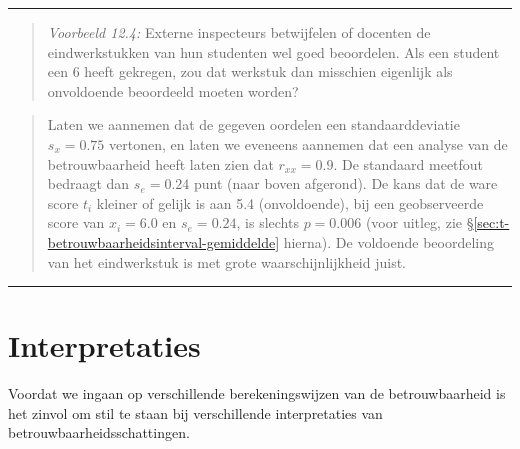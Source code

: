 \documentclass[
]{book}
\begin{document}
\begin{center}\rule{0.5\linewidth}{0.5pt}\end{center}

\begin{quote}
\emph{Voorbeeld 12.4:}
Externe inspecteurs betwijfelen of docenten de eindwerkstukken van hun
studenten wel goed beoordelen. Als een student een 6 heeft gekregen, zou
dat werkstuk dan misschien eigenlijk als onvoldoende beoordeeld moeten
worden?
\end{quote}

\begin{quote}
Laten we aannemen dat de gegeven oordelen een standaarddeviatie
\(s_x=0.75\) vertonen, en laten we eveneens aannemen dat een analyse van
de betrouwbaarheid heeft laten zien dat \(r_{xx}=0.9\). De standaard
meetfout bedraagt dan \(s_e = 0.24\) punt (naar boven afgerond). De kans
dat de ware score \(t_i\) kleiner of gelijk is aan 5.4 (onvoldoende), bij
een geobserveerde score van \(x_i=6.0\) en \(s_e=0.24\), is slechts \(p=0.006\)
(voor uitleg, zie §\ref{sec:t-betrouwbaarheidsinterval-gemiddelde} hierna).
De voldoende beoordeling van het eindwerkstuk is met grote
waarschijnlijkheid juist.
\end{quote}

\begin{center}\rule{0.5\linewidth}{0.5pt}\end{center}

\section{Interpretaties}\label{interpretaties}

Voordat we ingaan op verschillende berekeningswijzen van de
betrouwbaarheid is het zinvol om stil te staan bij verschillende
interpretaties van betrouwbaarheidsschattingen.
\end{document}
